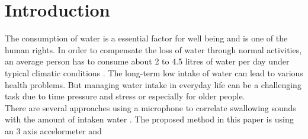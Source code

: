 \section{Introduction}
The consumption of water is a essential factor for well being and is one of the human rights. In order to compensate the loss of water through normal activities, an average person has to consume about 2 to 4.5 litres of water per day under typical climatic conditions \cite{doi:10.1080/02508069608686494}. The long-term low intake of water can lead to various health problems. But managing water intake in everyday life can be a challenging task due to time pressure and stress or especially for older people. \\
There are several approaches using a microphone to correlate swallowing sounds with the amount of intaken water \cite{7031280}. The proposed method in this paper is using an 3 axis accelormeter and 